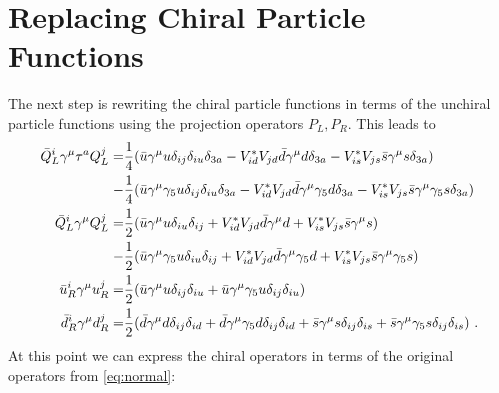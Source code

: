 \section{Replacing Chiral Particle Functions}
The next step is rewriting the chiral particle functions in terms of the unchiral particle functions using the projection operators $P_L,P_R$. This leads to
\begin{align}
	\bar{Q}_L^i\gamma^\mu\tau^a Q_L^j =&\frac{1}{4}(\bar{u}\gamma^\mu u\delta_{ij}\delta_{iu}\delta_{3a}
	- V_{id}^*V_{jd}\bar{d}\gamma^\mu d\delta_{3a} - V_{is}^*V_{js}\bar{s}\gamma^\mu s\delta_{3a})\notag \\
	-&\frac{1}{4} (\bar{u}\gamma^\mu \gamma_5u\delta_{ij}\delta_{iu}\delta_{3a} - V_{id}^*V_{jd}\bar{d}\gamma^\mu\gamma_5 d\delta_{3a} - V_{is}^*V_{js}\bar{s}\gamma^\mu\gamma_5 s\delta_{3a})\notag \\
	\bar{Q}_L^i\gamma^\mu Q_L^j =&\frac{1}{2}(
	\bar{u}\gamma^\mu u\delta_{iu}\delta_{ij} + V_{id}^*V_{jd}\bar{d}\gamma^\mu d
	+ V_{is}^*V_{js}\bar{s}\gamma^\mu s)\notag \\
	-&\frac{1}{2}(\bar{u}\gamma^\mu\gamma_5u\delta_{iu}\delta_{ij} + V_{id}^*V_{jd}\bar{d}\gamma^\mu\gamma_5d + V_{is}^*V_{js}\bar{s}\gamma^\mu\gamma_5s)\notag \\
	\bar{u}_R^i\gamma^\mu u_R^j =&\frac{1}{2}(\bar{u}\gamma^\mu u\delta_{ij}\delta_{iu} + \bar{u}\gamma^\mu \gamma_5u\delta_{ij}\delta_{iu})\notag \\
	\bar{d}_R^i\gamma^\mu d_R^j =&\frac{1}{2}(\bar{d}\gamma^\mu d\delta_{ij}\delta_{id} + \bar{d}\gamma^\mu\gamma_5d\delta_{ij}\delta_{id} + \bar{s}\gamma^\mu s\delta_{ij}\delta_{is} + \bar{s}\gamma^\mu \gamma_5s\delta_{ij}\delta_{is}) \ .
\end{align}
At this point we can express the chiral operators in terms of the original operators from \eqref{eq:normal}:
